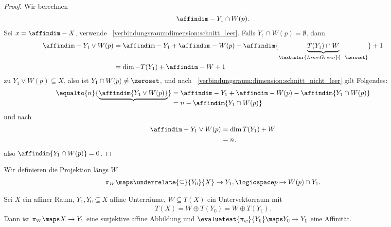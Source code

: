 \begin{proof}
    Wir berechnen
    \begin{align*}
        \affindim-{Y_1\cap W(p)}.
    \end{align*}
    Sei \( x=\affindim-{X} \), verwende ~\ref{verbindungsraum:dimension:schnitt_leer}.
    Falls \( Y_1\cap W(p)=\emptyset \), dann
    \begin{align*}
        \affindim-{Y_1\vee W(p)}\begin{aligned}[t] 
            &=\affindim-{Y_1}+\affindim-{W(p)}-\affindim{\underbrace{T(Y_1)\cap W}_{\textcolor{LimeGreen}{=\zeroset}}}+1\\
            &=\dim-{}{T(Y_1)}+\affindim-{W}+1
        \end{aligned}
    \end{align*}
    \contra zu \( Y_1\vee W(p)\subseteq X \), also ist \( Y_1\cap W(p)\neq \zeroset \), und nach ~\ref{verbindungsraum:dimension:schnitt_nicht_leer} gilt Folgendes:
    \begin{align*}
        \equalto{n}{\underbrace{\affindim{Y_1\vee W(p)}}}\begin{aligned}[t] 
            &=\affindim-{Y_1}+\affindim-{W(p)}-\affindim{Y_1\cap W(p)}\\
            &=n-\affindim{Y_1\cap W(p)}
        \end{aligned}
    \end{align*}
    und nach 
    \begin{align*}
        \affindim-{Y_1\vee W(p)}\begin{aligned}[t] 
            &=\dim{}{T(Y_1)+W}\\
            &=n,
        \end{aligned}
    \end{align*}
    also \( \affindim{Y_1\cap W(p)}=0 \).
    
\end{proof}
Wir definieren die Projektion längs \( W \)
\begin{align*}
    \pi_W\maps \underrelate{\subseteq}{Y_0}{X}\to Y_1,\logicspace p\mapsto W(p)\cap Y_1.
\end{align*}
\begin{satz}
    Sei \( X \) ein affiner Raum, \( Y_1,Y_0\subseteq X \) affine Unterräume, \( W\subseteq T(X) \) ein Untervektorraum mit 
    \begin{align*}
        T(X)=W\oplus T(Y_0)=W\oplus T(Y_1).
    \end{align*}
    Dann ist \( \pi_W\maps X\to Y_1 \) eine surjektive affine Abbildung und \( \evaluateat{\pi_w}{Y_0}\maps Y_0\to Y_1 \) eine Affinität.
\end{satz}
